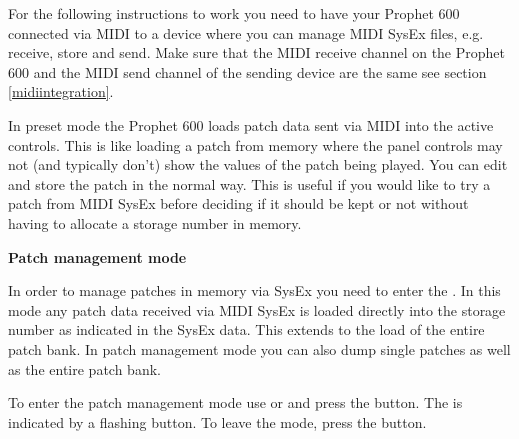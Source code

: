 
For the following instructions to work you need to have your Prophet 600 connected via MIDI to a device where you can manage MIDI SysEx files, e.g. receive, store and send. Make sure that the MIDI receive channel on the Prophet 600 and the MIDI send channel of the sending device are the same see section \ref{midiintegration}.

In preset mode the Prophet 600 loads patch data sent via MIDI into the active controls. This is like loading a patch from memory where the panel controls may not (and typically don't) show the values of the patch being played. You can edit and store the patch in the normal way. This is useful if you would like to try a patch from MIDI SysEx before deciding if it should be kept or not without having to allocate a storage number in memory. 

\textbf{Patch management mode}

In order to manage patches in memory via SysEx you need to enter the \patchmgmt. In this mode any patch data received via MIDI SysEx is loaded directly into the storage number as indicated in the SysEx data. This extends to the load of the entire patch bank. In patch management mode you can also dump single patches as well as the entire patch bank. 

To enter the patch management mode use \shiftmode or \shiftlock and press the \record button. The \patchmgmt is indicated by a flashing \preset button. To leave the mode, press the \record button. 

